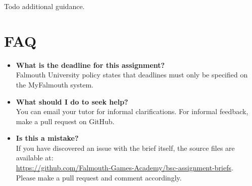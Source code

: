 Todo additional guidance.

\section*{FAQ}

\begin{itemize}
	\item 	\textbf{What is the deadline for this assignment?} \\ 
    		Falmouth University policy states that deadlines must only be specified on the MyFalmouth system.
    		
	\item 	\textbf{What should I do to seek help?} \\ 
    		You can email your tutor for informal clarifications. For informal feedback, make a pull request on GitHub. 
    		
    	\item 	\textbf{Is this a mistake?} \\ 	
    		If you have discovered an issue with the brief itself, the source files are available at: \\
    		\url{https://github.com/Falmouth-Games-Academy/bsc-assignment-briefs}.\\
    		 Please make a pull request and comment accordingly.
\end{itemize}




